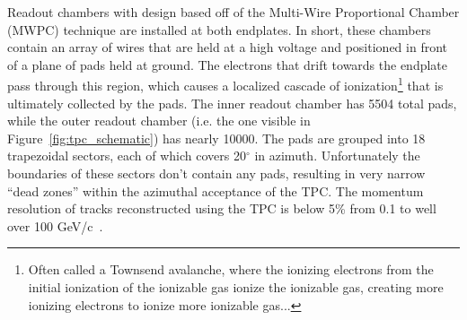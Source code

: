 Readout chambers with design based off of the Multi-Wire Proportional Chamber (MWPC) technique are installed at both endplates. In short, these chambers contain an array of wires that are held at a high voltage and positioned in front of a plane of pads held at ground. The electrons that drift towards the endplate pass through this region, which causes a localized cascade of ionization\footnote{Often called a Townsend avalanche, where the ionizing electrons from the initial ionization of the ionizable gas ionize the ionizable gas, creating more ionizing electrons to ionize more ionizable gas...} that is ultimately collected by the pads. The inner readout chamber has 5504 total pads, while the outer readout chamber (i.e. the one visible in Figure~\ref{fig:tpc_schematic}) has nearly 10000. The pads are grouped into 18 trapezoidal sectors, each of which covers 20$^\circ$ in azimuth. Unfortunately the boundaries of these sectors don't contain any pads, resulting in very narrow ``dead zones'' within the azimuthal acceptance of the TPC. The momentum resolution of tracks reconstructed using the TPC is below 5\% from 0.1 to well over 100 GeV/c~\cite{TPC2}.

